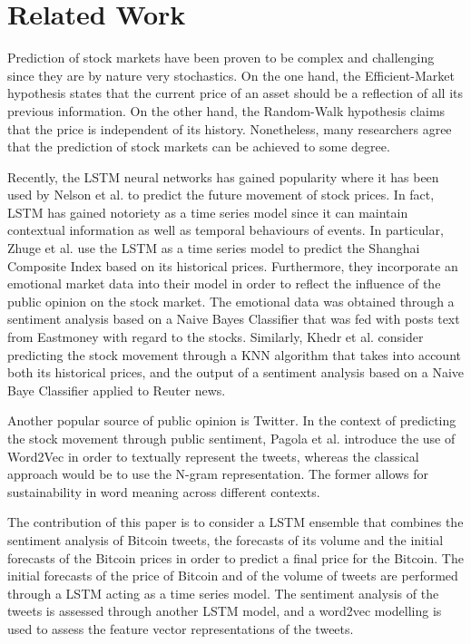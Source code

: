 \documentclass[conference]{IEEEtran}
\begin{document}
\section{Related Work}
\par Prediction of stock markets have been proven to be complex and challenging since they are by nature very stochastics. On the one hand, the Efficient-Market hypothesis states that the current price of an asset should be a reflection of all its previous information. On the other hand, the Random-Walk hypothesis claims that the price is independent of its history. Nonetheless, many researchers agree that the prediction of stock markets can be achieved to some degree.  
\par Recently, the LSTM neural networks has gained popularity where it has been used by Nelson et al. \cite{LSTM Stock} to predict the future movement of stock prices. In fact, LSTM has gained notoriety as a time series model since it can maintain contextual information as well as temporal behaviours of events. In particular, Zhuge et al. \cite{LSTM Emotional} use the LSTM as a time series model to predict the Shanghai Composite Index based on its historical prices. Furthermore, they incorporate an emotional market data into their model in order to reflect the influence of the public opinion on the stock market. The emotional data was obtained through a sentiment analysis based on a Naive Bayes Classifier that was fed with posts text from Eastmoney with regard to the stocks. Similarly, Khedr et al. \cite{Behavior}   consider predicting the stock movement through a KNN algorithm that takes into account both its historical prices, and the output of a sentiment analysis based on a Naive Baye Classifier applied to Reuter news. 
\par Another popular source of public opinion is Twitter. In the context of predicting the stock movement through public sentiment, Pagola et al. \cite{word2vec Twitter} introduce the use of Word2Vec in order to textually represent the tweets, whereas the classical approach would be to use the N-gram representation. The former allows for sustainability in word meaning across different contexts.
\par The contribution of this paper is to consider a LSTM ensemble that combines the sentiment analysis of Bitcoin tweets, the forecasts of its volume and the initial forecasts of the Bitcoin prices in order to predict a final price for the Bitcoin. The initial forecasts of the price of Bitcoin and of the volume of tweets are performed through a LSTM acting as a time series model. The sentiment analysis of the tweets is assessed through another LSTM model, and a word2vec modelling is used to assess the feature vector representations of the tweets.
\end{document}
